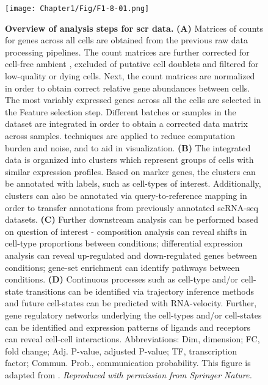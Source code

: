\begin{figure}[H]
    \centering
    \texttt{[image: Chapter1/Fig/F1-8-01.png]}
    \caption[Workflow for pre-processing and analysis of  data]
    {\textbf{Overview of analysis steps for \gls{scr} data.} \textbf{(A)} Matrices of counts for genes across all cells are obtained from the previous raw data processing pipelines. The count matrices are further corrected for cell-free ambient , excluded of putative cell doublets and filtered for low-quality or dying cells. Next, the count matrices are normalized in order to obtain correct relative gene abundances between cells. The most variably expressed genes across all the cells are selected in the Feature selection step. Different batches or samples in the dataset are integrated in order to obtain a corrected data matrix across samples.  techniques are applied to reduce computation burden and noise, and to aid in visualization. \textbf{(B)} The integrated data is organized into clusters which represent groups of cells with similar expression profiles. Based on marker genes, the clusters can be annotated with labels, such as cell-types of interest. Additionally, clusters can also be annotated via query-to-reference mapping in order to transfer annotations from previously annotated scRNA-seq datasets. \textbf{(C)} Further downstream analysis can be performed based on question of interest - composition analysis can reveal shifts in cell-type proportions between conditions; differential expression analysis can reveal up-regulated and down-regulated genes between conditions; gene-set enrichment can identify pathways between conditions. \textbf{(D)} Continuous processes such as cell-type and/or cell-state transitions can be identified via trajectory inference methods and future cell-states can be predicted with RNA-velocity. Further, gene regulatory networks underlying the cell-types and/or cell-states can be identified and expression patterns of ligands and receptors can reveal cell-cell interactions. Abbreviations: Dim, dimension; FC, fold change; Adj. P-value, adjusted P-value; TF, transcription factor; Commun. Prob., communication probability. This figure is adapted from \textbf{\cite{heumos_best_2023,weiler_guide_2022,armingol_deciphering_2021}}.\textit{ Reproduced with permission from Springer Nature.}}
    \label{fig:chp1_scrna-workflow}
\end{figure}
    

